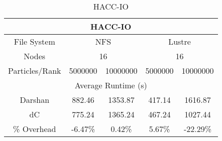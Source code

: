 \begin{table}[h]
\begin{subtable}[h]{0.45\textwidth}
    \end{subtable}
    \begin{subtable}[h]{0.45\textwidth}
        \centering
        \setlength\tabcolsep{3pt}
        \begin{tabular}{|ccccc|}
        \hline
        \multicolumn{5}{|c|}{HACC-IO}                                                                                                                                  \\ \hline
        \multicolumn{1}{|c|}{File System}      & \multicolumn{2}{c|}{NFS}                                            & \multicolumn{2}{c|}{Lustre}                     \\ \hline
        \multicolumn{1}{|c|}{Nodes}            & \multicolumn{2}{c|}{16}                                             & \multicolumn{2}{c|}{16}                         \\ \hline
        \multicolumn{1}{|c|}{Particles/Rank}   & \multicolumn{1}{c|}{5000000}     & \multicolumn{1}{c|}{10000000}    & \multicolumn{1}{c|}{5000000}     & 10000000     \\ \hline
        \multicolumn{5}{|c|}{Average Runtime (s)}                                                                                                                          \\ \hline
        \multicolumn{1}{|c|}{Darshan}          & \multicolumn{1}{c|}{882.46} & \multicolumn{1}{c|}{1353.87} & \multicolumn{1}{c|}{417.14} & 1616.87  \\ \hline
        \multicolumn{1}{|c|}{dC} & \multicolumn{1}{c|}{775.24} & \multicolumn{1}{c|}{1365.24} & \multicolumn{1}{c|}{467.24} & 1027.44  \\ \hline
        \multicolumn{1}{|c|}{\% Overhead}      & \multicolumn{1}{c|}{-6.47\%} & \multicolumn{1}{c|}{0.42\%} & \multicolumn{1}{c|}{5.67\%}  & -22.29\% \\ \hline
        \end{tabular}
    \caption{HACC-IO} 
    \label{subtable:HACC}
    \vspace{0.5cm}
    \end{subtable}
    

\end{table}
